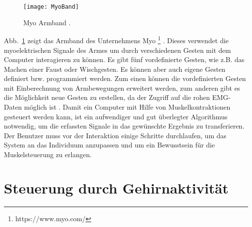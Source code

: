 \newline \newline
%
%
\begin{figure}
\centering
\texttt{[image: MyoBand]}
\caption{Myo Armband \cite{myoBand}.}
\label{fig:MyoBand}
\end{figure}
%
%
Abb.~\ref{fig:MyoBand} zeigt das Armband des Unternehmens Myo%
\footnote{https://www.myo.com/}
%
. Dieses verwendet die myoelektrischen Signale des Armes um durch verschiedenen Gesten mit dem Computer interagieren zu können. Es gibt fünf vordefinierte Gesten, wie z.B. das Machen einer Faust oder Wischgesten. Es können aber auch eigene Gesten definiert bzw. programmiert werden. Zum einen können die vordefinierten Gesten mit Einberechnung von Armbewegungen erweitert werden, zum anderen gibt es die Möglichkeit neue Gesten zu erstellen, da der Zugriff auf die rohen EMG-Daten möglich ist \cite{myoBand2}.%
\newline \newline \newline \newline \newline
Damit ein Computer mit Hilfe von Muskelkontraktionen gesteuert werden kann, ist ein aufwendiger und gut überlegter Algorithmus notwendig, um die erfassten Signale in das gewünschte Ergebnis zu transferieren. Der Benutzer muss vor der Interaktion einige Schritte durchlaufen, um das System an das Individuum anzupassen und um ein Bewusstsein für die Muskelsteuerung zu erlangen.


\section{Steuerung durch Gehirnaktivität}

